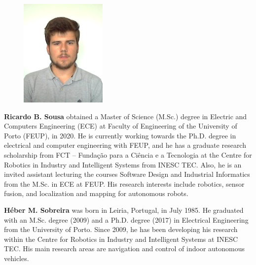 \documentclass[10pt,a4paper,notitlepage,twocolumn,oneside]{article}
\begin{document}


\twocolumn

\begin{figure}
\centering
\includegraphics[width=0.25\columnwidth]{figures/sousa.jpg}
\end{figure}
\noindent \textbf{Ricardo B. Sousa} obtained a Master of Science (M.Sc.) degree in Electric and Computers Engineering (ECE) at Faculty of Engineering of the University of Porto (FEUP), in 2020.
He is currently working towards the Ph.D. degree in electrical and computer engineering with FEUP, and he has a graduate research scholarship from FCT -- Fundação para a Ciência e a Tecnologia at the Centre for Robotics in Industry and Intelligent Systems from INESC TEC.
Also, he is an invited assistant lecturing the courses Software Design and Industrial Informatics from the M.Sc. in ECE at FEUP.
His research interests include robotics, sensor fusion, and localization and mapping for autonomous robots.

\hfill\break

\noindent \textbf{H\'{e}ber M. Sobreira} was born in Leiria, Portugal, in July 1985. He graduated with an M.Sc. degree (2009) and a Ph.D. degree (2017) in Electrical Engineering from the University of Porto. Since 2009, he has been developing his research within the Centre for Robotics in Industry and Intelligent Systems at INESC TEC. His main research areas are navigation and control of indoor autonomous vehicles.

\newpage
\end{document}
